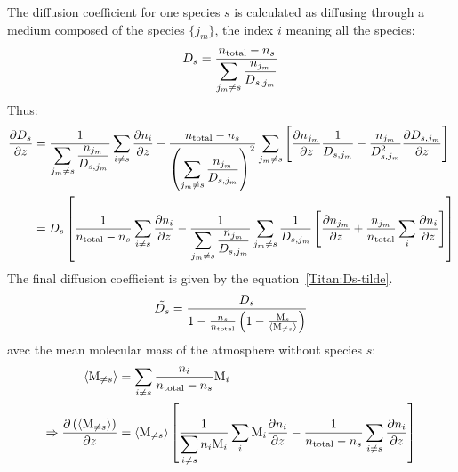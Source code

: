 The diffusion coefficient for one species $s$ is calculated as diffusing through
a medium composed of the species $\{j_m\}$, the index $i$ meaning all the
species:
\begin{equation}
D_s = \frac{n_\text{total} - n_s}{\displaystyle\sum_{j_m \neq s}\frac{n_{j_m}}{D_{s,j_m}}}
\label{Titan:Ds}
\end{equation}
Thus:
\begin{equation}
\begin{split}
\frac{\partial D_s}{\partial z} & = \frac{1}{\displaystyle\sum_{j_m \neq s}\frac{n_{j_m}}{D_{s,j_m}}}\displaystyle\sum_{i\neq s}\frac{\partial n_i}{\partial z} 
                      - \frac{n_\text{total} - n_s}{\left(\displaystyle\sum_{j_m \neq s}\frac{n_{j_m}}{D_{s,j_m}}\right)^2}
                        \displaystyle\sum_{j_m \neq s} 
                                \left[\frac{\partial n_{j_m}}{\partial z}\frac{1}{D_{s,j_m}} - \frac{n_{j_m}}{D_{s,j_m}^2}\frac{\partial D_{s,j_m}}{\partial z}\right]\\
                    & = D_s\left[\frac{1}{n_\text{total} - n_s}\displaystyle\sum_{i\neq s}\frac{\partial n_i}{\partial z} 
                      - \frac{1}{\displaystyle\sum_{j_m \neq s}\frac{n_{j_m}}{D_{s,j_m}}}
                        \displaystyle\sum_{j_m \neq s}\frac{1}{D_{s,j_m}}
                                \left[\frac{\partial n_{j_m}}{\partial z} + \frac{n_{j_m}}{n_\text{total}}\sum_{i}\frac{\partial n_{i}}{\partial z}\right]
                                \right]
\end{split}
\label{Titan:dDs_dz}
\end{equation}
The final diffusion coefficient is given by the equation~\ref{Titan:Ds-tilde}.
\begin{equation}
\tilde{D_s} = \frac{D_s}{1-\frac{n_s}{n_\text{total}}\left(1 - \frac{\text{M}_s}{\langle\text{M}_{\neq s}\rangle}\right)}
\label{Titan:Ds-tilde}
\end{equation}
avec  the mean molecular mass of the atmosphere without
species $s$:
\begin{equation}
\begin{split}
\langle\text{M}_{\neq s}\rangle & = \sum_{i\neq s} \frac{n_i}{n_\text{total} - n_s}\text{M}_i\\
\Rightarrow \frac{\partial\left(\langle\text{M}_{\neq s}\rangle\right)}{\partial z} &
                = \langle\text{M}_{\neq s}\rangle\left[\frac{1}{\displaystyle\sum_{i\neq s}n_i\text{M}_i} \sum_i \text{M}_i\frac{\partial n_i}{\partial z}
                  - \frac{1}{n_\text{total} - n_s} \sum_{i\neq s}\frac{\partial n_i}{\partial z}\right]
\end{split}
\end{equation}
